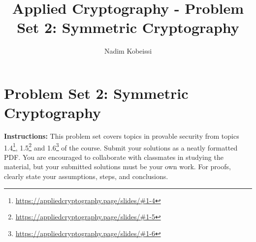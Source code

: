 \documentclass[10pt,a4paper,american]{exam}
\title{Applied Cryptography - Problem Set 2: Symmetric Cryptography}
\author{Nadim Kobeissi}
\begin{document}
\classhandoutheader
\section*{Problem Set 2: Symmetric Cryptography}

\begin{tcolorbox}[colframe=OliveGreen!30!white,colback=OliveGreen!5!white]
	\textbf{Instructions:} This problem set covers topics in provable security from topics 1.4\footnote{\url{https://appliedcryptography.page/slides/\#1-4}}, 1.5\footnote{\url{https://appliedcryptography.page/slides/\#1-5}} and 1.6\footnote{\url{https://appliedcryptography.page/slides/\#1-6}} of the course. Submit your solutions as a neatly formatted PDF. You are encouraged to collaborate with classmates in studying the material, but your submitted solutions must be your own work. For proofs, clearly state your assumptions, steps, and conclusions.
\end{tcolorbox}
\end{document}
